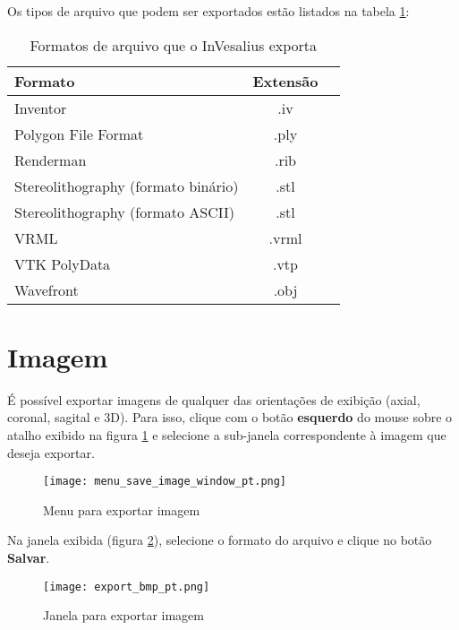 Os tipos de arquivo que podem ser exportados estão listados na tabela
\ref{tab:files_export_list}:

\begin{table}[h]
\centering
\caption{Formatos de arquivo que o InVesalius exporta}
\begin{tabular}{lcc}\\
\hline %
Formato & Extensão\\
\hline
\hline
Inventor & .iv\\
Polygon File Format & .ply\\
Renderman & .rib\\
Stereolithography (formato binário)& .stl\\
Stereolithography (formato ASCII) & .stl\\
VRML & .vrml\\
VTK PolyData & .vtp\\
Wavefront & .obj\\
\hline
\end{tabular}
\label{tab:files_export_list}
\end{table} 


\section{Imagem}

É possível exportar imagens de qualquer das orientações de exibição (axial, coronal,
sagital e 3D). Para isso, clique com o botão \textbf{esquerdo} do mouse sobre o atalho
exibido na figura \ref{fig:menu_save_image_window} e selecione a sub-janela correspondente
à imagem que deseja exportar.

\begin{figure}[!htb]
\centering
\texttt{[image: menu\_save\_image\_window\_pt.png]}
\caption{Menu para exportar imagem}
\label{fig:menu_save_image_window}
\end{figure}

Na janela exibida (figura \ref{fig:save_image_window}), selecione o formato do arquivo e
clique no botão \textbf{Salvar}.

\begin{figure}[!htb]
\centering
\texttt{[image: export\_bmp\_pt.png]}
\caption{Janela para exportar imagem}
\label{fig:save_image_window}
\end{figure}
